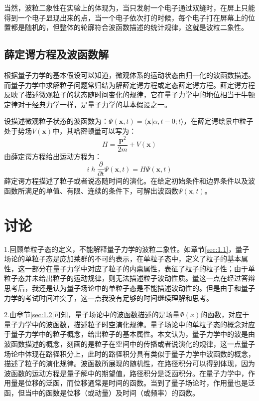 \documentclass[10pt,a4paper]{article}
\begin{document}
当然，波粒二象性在实验上的体现为，当只发射一个电子通过双缝时，在屏上只能得到一个电子显现出来的点，当一个电子依次打的时候，每个电子打在屏幕上的位置都是随机的，但整体的轮廓符合波函数描述的统计规律，这就是波粒二象性。


\subsection{薛定谔方程及波函数解}
\label{sec:2.2}
根据量子力学的基本假设可以知道，微观体系的运动状态由归一化的波函数描述。而量子力学中求解粒子问题常归结为解薛定谔方程或定态薛定谔方程。薛定谔方程反映了描述微观粒子的状态随时间变化的规律，它在量子力学中的地位相当于牛顿定律对于经典力学一样，是量子力学的基本假设之一。\cite{2006现代量子力学}

设描述微观粒子状态的波函数为：$\Psi(\textbf{x},t)=\langle \textbf{x}|\alpha,t-0;t\rangle$，在薛定谔绘景中粒子处于势场$V(\textbf{x})$中，其哈密顿量可以写为：
\[H=\frac{\textbf{p}^2}{2m}+V(\textbf{x})\]
由薛定谔方程给出运动方程为：
\begin{equation}
\label{eq:333}
i\hslash\frac{\partial}{\partial t}\Psi(\textbf{x},t)=H\Psi(\textbf{x},t)
\end{equation}
薛定谔方程描述了粒子或者说态随时间的演化。在给定初始条件和边界条件以及波函数所满足的单值、有限、连续的条件下，可解出波函数$\Psi(\textbf{x},t)$。
\newpage
\section{讨论}
1.回顾单粒子态的定义，不能解释量子力学的波粒二象性。如章节\ref{sec:1.1}，量子场论的单粒子态是庞加莱群的不可约表示，在单粒子态中，定义了粒子的基本属性，这一部分在量子力学中对应了粒子的内禀属性，表征了粒子的粒子性；由于单粒子态并未给出粒子的运动规律，则无法描述粒子波动性质。量这一点在经过答辩思考后，我还是认为量子场论中的单粒子态是不能描述波动性的。但是由于和量子力学的考试时间冲突了，这一点我没有足够的时间继续理解和思考。

2.由章节\ref{sec:1.2}可知，量子场论中的波函数描述的是场量$\Phi(x)$的函数，对应于量子力学中的波函数，描述粒子时空演化规律。量子场论中的单粒子态的概念对应于量子力学中的粒子概念，给出粒子的基本属性。本文认为，量子力学中的波是由波函数描述的概念，刻画的是粒子在空间中的传播或者说演化的规律，这一点量子场论中体现在路径积分上，此时的路径积分具有类似于量子力学中波函数的概念，描述了粒子的演化规律。波函数所展现的随机性，在路径积分可以得到体现，因为波函数的运动方程是量子解中的期望值，路径积分是泛函积分。在量子力学中，作用量是位移的泛函，而位移通常是时间的函数。当到了量子场论时，作用量也是泛函，但当中的函数是位移（或动量）及时间（或频率）的函数。
\end{document}
